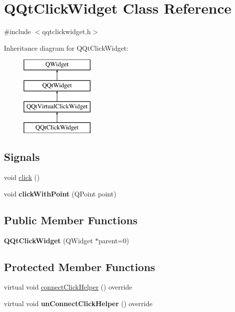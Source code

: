 \hypertarget{class_q_qt_click_widget}{}\section{Q\+Qt\+Click\+Widget Class Reference}
\label{class_q_qt_click_widget}


{\ttfamily \#include $<$qqtclickwidget.\+h$>$}

Inheritance diagram for Q\+Qt\+Click\+Widget\+:\begin{figure}[H]
\begin{center}
\leavevmode
\includegraphics[height=4.000000cm]{class_q_qt_click_widget}
\end{center}
\end{figure}
\subsection*{Signals}
\begin{DoxyCompactItemize}
\item 
void \mbox{\hyperlink{class_q_qt_click_widget_ac78fecd3913ed3e6dbe9df7acd3a02fe}{click}} ()
\item 
\mbox{\label{class_q_qt_click_widget_a9a818fd673ddaf82ed5366d5733ab2dc}} 
void {\bfseries click\+With\+Point} (Q\+Point point)
\end{DoxyCompactItemize}
\subsection*{Public Member Functions}
\begin{DoxyCompactItemize}
\item 
\mbox{\label{class_q_qt_click_widget_a7c030f6ff1bc49557df603f6510a21f7}} 
{\bfseries Q\+Qt\+Click\+Widget} (Q\+Widget $\ast$parent=0)
\end{DoxyCompactItemize}
\subsection*{Protected Member Functions}
\begin{DoxyCompactItemize}
\item 
virtual void \mbox{\hyperlink{class_q_qt_click_widget_ad70931a1404abafddd82679cd3b7c414}{connect\+Click\+Helper}} () override
\item 
\mbox{\label{class_q_qt_click_widget_a104a3a6d6e463a6684087a28817f4e48}} 
virtual void {\bfseries un\+Connect\+Click\+Helper} () override
\end{DoxyCompactItemize}
